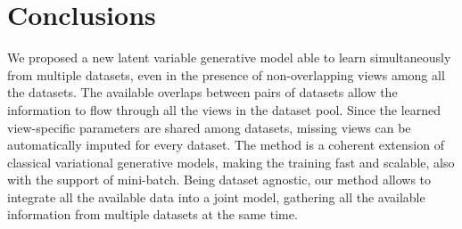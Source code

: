 \section{Conclusions}
 We proposed a new latent variable generative model able to learn simultaneously from multiple datasets, even in the presence of non-overlapping views among all the datasets.
 The available overlaps between pairs of datasets allow the information to flow through all the views in the dataset pool.
 Since the learned view-specific parameters are shared among datasets, missing views can be automatically imputed for every dataset.
 The method is a coherent extension of classical variational generative models, making the training fast and scalable, also with the support of mini-batch.
 Being dataset agnostic, our method allows to integrate all the available data into a joint model, gathering  all the available information from multiple datasets at the same time.
